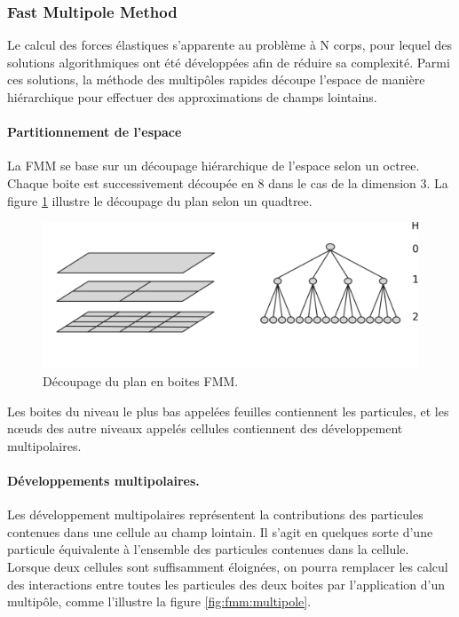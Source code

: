 \documentclass[11pt,class=article,float=false,crop=false]{standalone}
\begin{document}
\subsubsection{Fast Multipole Method}
\label{sec:FMM}

Le calcul des forces élastiques s'apparente au problème à N corps, pour lequel des solutions algorithmiques ont été développées afin de réduire sa complexité. Parmi ces solutions, la méthode des multipôles rapides découpe l'espace de manière hiérarchique pour effectuer des approximations de champs lointains.

\paragraph{Partitionnement de l'espace}

La FMM se base sur un découpage hiérarchique de l'espace selon un octree. Chaque boite est successivement découpée en 8 dans le cas de la dimension 3. La figure \ref{fig:FMM:octree} illustre le découpage du plan selon un quadtree.

\begin{figure}[H]
	\centering
	\includegraphics[width=\textwidth]{img/fmm-octree}
	\caption{Découpage du plan en boites FMM.}
	\label{fig:FMM:octree}
\end{figure}

Les boites du niveau le plus bas appelées feuilles contiennent les particules, et les nœuds des autre niveaux appelés cellules contiennent des développement multipolaires.

\paragraph{Développements multipolaires.}

Les développement multipolaires représentent la contributions des particules contenues dans une cellule au champ lointain. Il s'agit en quelques sorte d'une particule équivalente à l'ensemble des particules contenues dans la cellule. Lorsque deux cellules sont suffisamment éloignées, on pourra remplacer les calcul des interactions entre toutes les particules des deux boites par l'application d'un multipôle, comme l'illustre la figure \ref{fig:fmm:multipole}.
\end{document}
